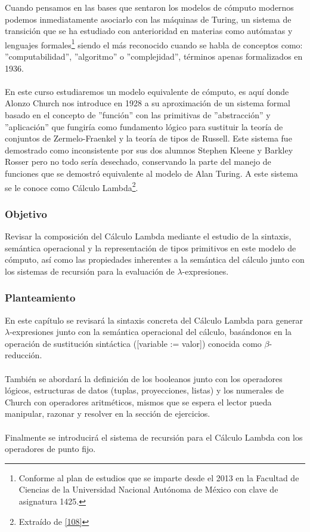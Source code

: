 Cuando pensamos en las bases que sentaron los modelos de cómputo modernos podemos inmediatamente asociarlo con las máquinas de Turing, un sistema de transición que se ha estudiado con anterioridad en materias como autómatas y lenguajes formales\footnote{Conforme al plan de estudios que se imparte desde el 2013 en la Facultad de Ciencias de la Universidad Nacional Autónoma de México con clave de asignatura 1425. } siendo el más reconocido cuando se habla de conceptos como: ''computabilidad'', ''algoritmo'' o ''complejidad'', términos apenas formalizados en 1936.\\\\
En este curso estudiaremos un modelo equivalente de cómputo, es aquí donde Alonzo Church nos introduce en 1928 a su aproximación de un sistema formal basado en el concepto de ''función'' con las primitivas de ''abstracción'' y ''aplicación'' que fungiría como fundamento lógico para sustituir la teoría de conjuntos de Zermelo-Fraenkel y la teoría de tipos de Russell. Este sistema fue demostrado como inconsistente por sus dos alumnos Stephen Kleene y Barkley Rosser pero no todo sería desechado, conservando la parte del manejo de funciones que se demostró equivalente al modelo de Alan Turing. A este sistema se le conoce como Cálculo Lambda\footnote{Extraído de  \hyperlink{108}{[108]}}.\\


\subsubsection{Objetivo}
Revisar la composición del Cálculo Lambda mediante el estudio de la sintaxis, semántica operacional y la representación de tipos primitivos en este modelo de cómputo, así como las propiedades inherentes a la semántica del cálculo junto con los sistemas de recursión para la evaluación de $\lambda$-expresiones. \\ 

\subsubsection{Planteamiento}
En este capítulo se revisará la sintaxis concreta del Cálculo Lambda para generar $\lambda$-expresiones junto con
la semántica operacional del cálculo, basándonos en la operación de sustitución sintáctica ([variable := valor]) conocida como $\beta$-reducción.\\\\
También se abordará la definición de los booleanos junto con los operadores lógicos, estructuras de datos (tuplas, proyecciones, listas) y los numerales de Church con operadores aritméticos, mismos que se espera el lector pueda manipular, razonar y resolver en la sección de ejercicios. \\\\
Finalmente se introducirá el sistema de recursión para el Cálculo Lambda con los operadores de punto fijo.



